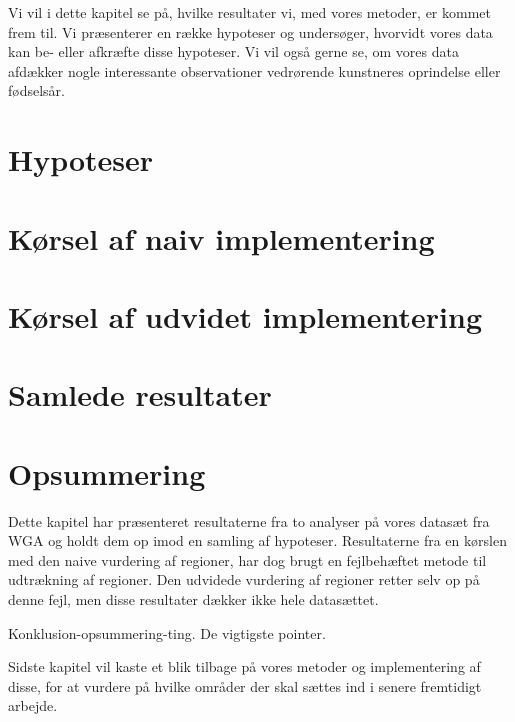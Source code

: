{
{\sffamily Vi vil i dette kapitel se på, hvilke resultater vi, med vores
metoder, er kommet frem til. Vi præsenterer en række hypoteser og
undersøger, hvorvidt vores data kan be- eller afkræfte disse hypoteser.
Vi vil også gerne se, om vores data afdækker nogle interessante
observationer vedrørende kunstneres oprindelse eller fødselsår.
}

\section{Hypoteser}


\section{Kørsel af naiv implementering\label{section_naiv_koersel}}

\clearpage

\section{Kørsel af udvidet implementering\label{section_udvidet_koersel}}


\section{Samlede resultater\label{section_samlede_resultater}}


\section*{Opsummering}
Dette kapitel har præsenteret resultaterne fra to analyser på vores
datasæt fra WGA og holdt dem op imod en samling af hypoteser.
Resultaterne fra en kørslen med den naive vurdering af regioner, har dog
brugt en fejlbehæftet metode til udtrækning af regioner.  Den udvidede
vurdering af regioner retter selv op på denne fejl, men disse resultater
dækker ikke hele datasættet.

Konklusion-opsummering-ting. De vigtigste pointer.

Sidste kapitel vil kaste et blik tilbage på vores metoder og
implementering af disse, for at vurdere på hvilke områder der skal
sættes ind i senere fremtidigt arbejde.

}
